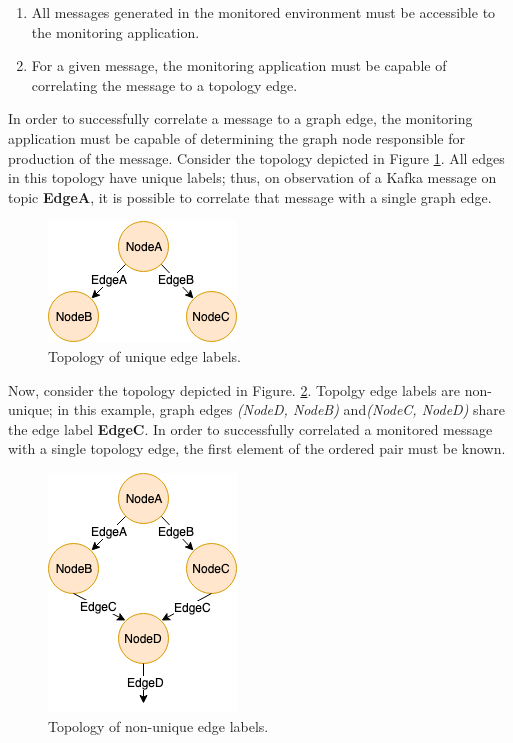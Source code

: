 \begin{enumerate}
	\item All messages generated in the monitored environment must be accessible to the monitoring application.
	\item For a given message, the monitoring application must be capable of correlating the message to a  topology edge.
\end{enumerate}

In order to successfully correlate a message to a graph edge, the monitoring application must be capable of determining the graph node responsible for production of the message. Consider the topology depicted in Figure \ref{topology_unique_edge_labels}. All edges in this topology have unique labels; thus, on observation of a Kafka message on topic \textbf{EdgeA}, it is possible to correlate that message with a single graph edge.

\begin{figure}[H]
	\centering  
	\includegraphics[scale=0.8]{figures/design/topology_unique_edges.png}
	\caption{Topology of unique edge labels.}
	\label{topology_unique_edge_labels}
\end{figure}

Now, consider the topology depicted in Figure. \ref{topology_non_unique_edge_labels}. Topolgy edge labels are non-unique; in this example, graph edges \textit{(NodeD, NodeB)} and\textit{(NodeC, NodeD)} share the edge label \textbf{EdgeC}. In order to successfully correlated a monitored message with a single topology edge, the first element of the ordered pair must be known.

\vspace{5mm}

\begin{figure}[H]
	\centering  
	\includegraphics[scale=0.8]{figures/design/topology_non_unique_edges.png}
	\caption{Topology of non-unique edge labels.}
	\label{topology_non_unique_edge_labels}
\end{figure}

